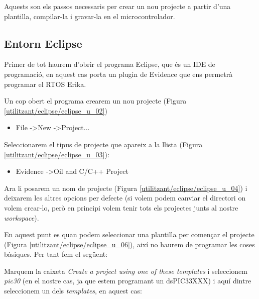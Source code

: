 Aquests son els passos necessaris per crear un nou projecte a partir d'una plantilla, compilar-la i gravar-la en el microcontrolador.

\subsection{Entorn Eclipse}

Primer de tot haurem d'obrir el programa Eclipse, que és un IDE de programació, en aquest cas porta un plugin \RTDruid de Evidence que ens permetrà programar el RTOS \g Erika.

Un cop obert el programa crearem un nou projecte (Figura \ref{utilitzant/eclipse/eclipse_u_02})

\begin{itemize}
	\item File -\textgreater New -\textgreater Project...
\end{itemize}



Seleccionarem el tipus de projecte que apareix a la llista (Figura \ref{utilitzant/eclipse/eclipse_u_03}):

\begin{itemize}
	\item Evidence -\textgreater \RTDruid Oil and C/C++ Project
\end{itemize}


Ara li posarem un nom de projecte (Figura \ref{utilitzant/eclipse/eclipse_u_04}) i deixarem les altres opcions per defecte (si volem podem canviar el directori on volem crear-lo, però en principi volem tenir tots els projectes junts al nostre \emph{workspace}).


En aquest punt es quan podem seleccionar una plantilla per començar el projecte (Figura \ref{utilitzant/eclipse/eclipse_u_06}), així no haurem de programar les coses bàsiques. Per tant fem el següent:

Marquem la caixeta \emph{Create a project using one of these templates} i seleccionem \emph{pic30} (en el nostre cas, ja que estem programant un dsPIC33XXX) i aquí dintre seleccionem un dels \emph{templates}, en aquest cas:

